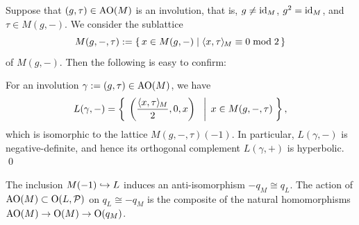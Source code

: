\documentclass{amsart} %
\begin{document}
%
Suppose that $(g, \tau)\in \mathord{\mathrm{AO}}(M)$ is an involution, 
that is, $g\ne \mathord{\mathrm{id}}_M$, $g^2=\mathord{\mathrm{id}}_M$, and $\tau\in M(g, -)$.
We consider the sublattice 
\[
M(g, -,\tau):=\{\,{x\in M(g, -)}\mid {\langle x, \tau \rangle_{\hskip -1pt M}\equiv 0 \bmod 2} \,\}
\]
of $M(g, -)$.
Then the following is easy to confirm:
%
\begin{proposition}\label{prop:involL}
For an involution $\gamma:=(g, \tau)\in \mathord{\mathrm{AO}}(M)$, we have 
\[
L(\gamma, -)=\left\{\; \left. {\left(\frac{\langle x, \tau \rangle_{\hskip -1pt M}}{2}, 0, x\right)\;\;} \; \right\vert \; {x \in M(g, -,\tau)} \; \right \},
\]
which is isomorphic to 
the lattice $M(g, -,\tau)(-1)$.
In particular, 
$L(\gamma, -)$ is negative-definite, and 
hence its orthogonal complement $L(\gamma, +)$ is hyperbolic.
\qed
\end{proposition}
%
\begin{remark}
The inclusion $M(-1)\hookrightarrow L$ induces an anti-isomorphism $-q_M\cong q_L$.
The action of $\mathord{\mathrm{AO}}(M)\subset \mathord{\mathrm{O}}(L, \mathord{\mathcal{P}})$ on $q_L\cong -q_M$ 
is the composite of the natural homomorphisms $\mathord{\mathrm{AO}}(M) \to \mathord{\mathrm{O}}(M)\to \mathord{\mathrm{O}}(q_M)$.
\end{remark}
%
\end{document}
